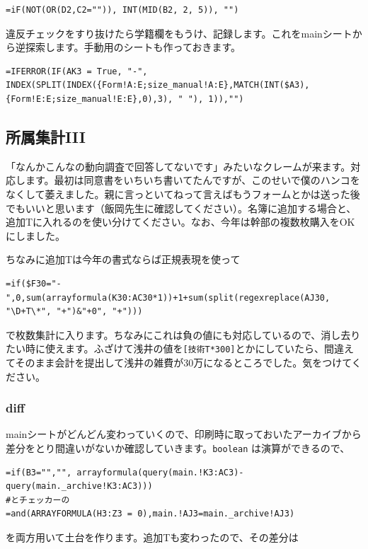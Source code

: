 \documentclass[dvipdfmx,jb5]{jreport}
\begin{document}
\begin{lstlisting}
=iF(NOT(OR(D2,C2="")), INT(MID(B2, 2, 5)), "")
\end{lstlisting}

違反チェックをすり抜けたら学籍欄をもうけ、記録します。これをmainシートから逆探索します。手動用のシートも作っておきます。

\begin{lstlisting}
=IFERROR(IF(AK3 = True, "-", INDEX(SPLIT(INDEX({Form!A:E;size_manual!A:E},MATCH(INT($A3),{Form!E:E;size_manual!E:E},0),3), " "), 1)),"")
\end{lstlisting}

\subsection{所属集計III}
「なんかこんなの動向調査で回答してないです」みたいなクレームが来ます。対応します。最初は同意書をいちいち書いてたんですが、このせいで僕のハンコをなくして萎えました。親に言っといてねって言えばもうフォームとかは送った後でもいいと思います（飯岡先生に確認してください）。名簿に追加する場合と、追加Tに入れるのを使い分けてください。なお、今年は幹部の複数枚購入をOKにしました。

ちなみに追加Tは今年の書式ならば正規表現を使って

\begin{lstlisting}
=if($F30="-",0,sum(arrayformula(K30:AC30*1))+1+sum(split(regexreplace(AJ30, "\D+T\*", "+")&"+0", "+")))
\end{lstlisting}

で枚数集計に入ります。ちなみにこれは負の値にも対応しているので、消し去りたい時に使えます。ふざけて浅井の値を\texttt{[技術T*300]}とかにしていたら、間違えてそのまま会計を提出して浅井の雑費が30万になるところでした。気をつけてください。

\subsubsection{diff}
mainシートがどんどん変わっていくので、印刷時に取っておいたアーカイブから差分をとり間違いがないか確認していきます。\texttt{boolean} は演算ができるので、

\begin{lstlisting}
=if(B3="","", arrayformula(query(main.!K3:AC3)-query(main._archive!K3:AC3)))
#とチェッカーの
=and(ARRAYFORMULA(H3:Z3 = 0),main.!AJ3=main._archive!AJ3)
\end{lstlisting}

を両方用いて土台を作ります。追加Tも変わったので、その差分は
\end{document}
